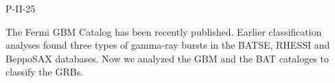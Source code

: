 P-II-25


\bigskip



\bigskip

\noindent The Fermi GBM Catalog has been recently published. Earlier classification analyses found three types of gamma-ray bursts in the BATSE, RHESSI and BeppoSAX databases. Now we analyzed the GBM and the BAT cataloges to classify the GRBs.

